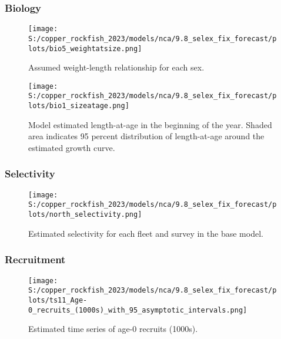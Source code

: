 \documentclass[11pt,
  english,
  letterpaper,
]{article}
\begin{document}
\pagebreak

\pagebreak

\hypertarget{biology-1}{%
\subsubsection{Biology}\label{biology-1}}

\begin{figure}
\centering
\texttt{[image: S:/copper\_rockfish\_2023/models/nca/9.8\_selex\_fix\_forecast/plots/bio5\_weightatsize.png]}
\caption{Assumed weight-length relationship for each sex.\label{fig:est-len-wght}}
\end{figure}

\pagebreak

\begin{figure}
\centering
\texttt{[image: S:/copper\_rockfish\_2023/models/nca/9.8\_selex\_fix\_forecast/plots/bio1\_sizeatage.png]}
\caption{Model estimated length-at-age in the beginning of the year. Shaded area indicates 95 percent distribution of length-at-age around the estimated growth curve.\label{fig:mod-est-len-age}}
\end{figure}

\pagebreak

\hypertarget{selectivity}{%
\subsubsection{Selectivity}\label{selectivity}}

\begin{figure}
\centering
\texttt{[image: S:/copper\_rockfish\_2023/models/nca/9.8\_selex\_fix\_forecast/plots/north\_selectivity.png]}
\caption{Estimated selectivity for each fleet and survey in the base model.\label{fig:est-selex}}
\end{figure}

\pagebreak

\hypertarget{recruitment-1}{%
\subsubsection{Recruitment}\label{recruitment-1}}

\begin{figure}
\centering
\texttt{[image: S:/copper\_rockfish\_2023/models/nca/9.8\_selex\_fix\_forecast/plots/ts11\_Age-0\_recruits\_(1000s)\_with\_95\_asymptotic\_intervals.png]}
\caption{Estimated time series of age-0 recruits (1000s).\label{fig:recruits}}
\end{figure}
\end{document}
